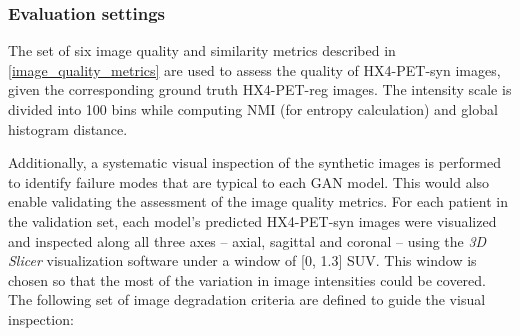 \subsubsection{Evaluation settings}
The set of six image quality and similarity metrics described in \ref{image_quality_metrics} are used to assess the quality of HX4-PET-syn images, given the corresponding ground truth HX4-PET-reg images. The intensity scale is divided into 100 bins while computing NMI (for entropy calculation) and global histogram distance.

Additionally, a systematic visual inspection of the synthetic images is performed to identify failure modes that are typical to each GAN model. This would also enable validating the assessment of the image quality metrics. For each patient in the validation set, each model's predicted HX4-PET-syn images were visualized and inspected along all three axes -- axial, sagittal and coronal -- using the \textit{3D Slicer} visualization software \cite{kikinis20143d} under a window of [0, 1.3] SUV. This window is chosen so that the most of the variation in image intensities could be covered. The following set of image degradation criteria are defined to guide the visual inspection:

